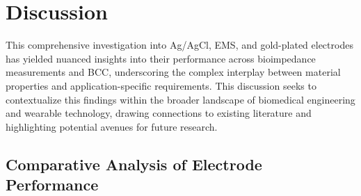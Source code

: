\documentclass[conference]{IEEEtran}
\begin{document}

\section{Discussion}

This comprehensive investigation into Ag/AgCl, EMS, and gold-plated electrodes has yielded nuanced insights into their performance across bioimpedance measurements and \gls{BCC}, underscoring the complex interplay between material properties and application-specific requirements. This discussion seeks to contextualize this findings within the broader landscape of biomedical engineering and wearable technology, drawing connections to existing literature and highlighting potential avenues for future research.

\subsection{Comparative Analysis of Electrode Performance}
\end{document}
